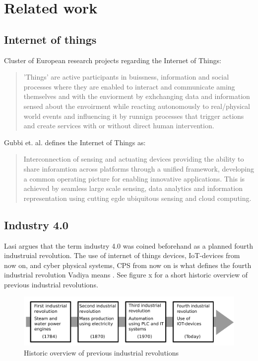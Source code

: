 \section{Related work}
\subsection{Internet of things}
Cluster of European research projects \cite{Gubbi2013}  regarding the Internet of Things:
\begin{quote}
    'Things' are active participants in buissness, information and social processes where they are enabled to interact and communicate aming themselves and with the enviorment by exhchanging data and information sensed about the envoirment while reacting autonomously to real/physical world events and influencing it by runnign processes that trigger actions and create services with or without direct human intervention.
\end{quote} 

Gubbi et. al. \cite{Gubbi2013} defines the Internet of Things as:
\begin{quote}
    Interconnection of sensing and actuating devices providing the ability to share inforamtion across platforms through a unified framework, developing a common operating picture for enabling innovative applications. 
    This is achieved by seamless large scale sensing, data analytics and information representation using cutting egde ubiquitous sensing and cloud computing.
\end{quote}

\subsection{Industry 4.0}
Lasi \cite{Lasi2014}  argues that the term industry 4.0 was coined beforehand as a planned fourth industruial revolution.
The use of internet of things devices, IoT-devices from now on, and cyber physical systems, CPS from now on is what defines the fourth industrial revolution Vadiya means \cite{Vaidya2018}.
See figure x for a short historic overview of previous industrial revolutions. 
\begin{figure}
    \centering
    \includegraphics[width=\textwidth]{Pictures/Industrial_revolution.pdf} 
    \caption{Historic overview of previous industrial revolutions}
    \label{Indutrial revolutions}
\end{figure}

